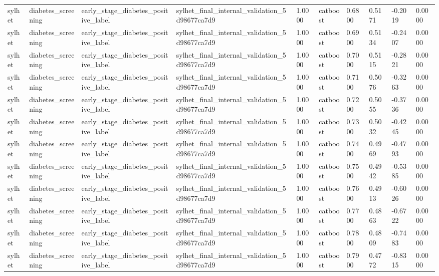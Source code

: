 \begin{tabular}{llllllllll}
sylhet & diabetes\_screening & early\_stage\_diabetes\_positive\_label & sylhet\_final\_internal\_validation\_5d98677ca7d9 & 1.0000 & catboost & 0.6800 & 0.5171 & -0.2019 & 0.0000 \\
sylhet & diabetes\_screening & early\_stage\_diabetes\_positive\_label & sylhet\_final\_internal\_validation\_5d98677ca7d9 & 1.0000 & catboost & 0.6900 & 0.5134 & -0.2407 & 0.0000 \\
sylhet & diabetes\_screening & early\_stage\_diabetes\_positive\_label & sylhet\_final\_internal\_validation\_5d98677ca7d9 & 1.0000 & catboost & 0.7000 & 0.5115 & -0.2821 & 0.0000 \\
sylhet & diabetes\_screening & early\_stage\_diabetes\_positive\_label & sylhet\_final\_internal\_validation\_5d98677ca7d9 & 1.0000 & catboost & 0.7100 & 0.5076 & -0.3263 & 0.0000 \\
sylhet & diabetes\_screening & early\_stage\_diabetes\_positive\_label & sylhet\_final\_internal\_validation\_5d98677ca7d9 & 1.0000 & catboost & 0.7200 & 0.5055 & -0.3736 & 0.0000 \\
sylhet & diabetes\_screening & early\_stage\_diabetes\_positive\_label & sylhet\_final\_internal\_validation\_5d98677ca7d9 & 1.0000 & catboost & 0.7300 & 0.5032 & -0.4245 & 0.0000 \\
sylhet & diabetes\_screening & early\_stage\_diabetes\_positive\_label & sylhet\_final\_internal\_validation\_5d98677ca7d9 & 1.0000 & catboost & 0.7400 & 0.4969 & -0.4793 & 0.0000 \\
sylhet & diabetes\_screening & early\_stage\_diabetes\_positive\_label & sylhet\_final\_internal\_validation\_5d98677ca7d9 & 1.0000 & catboost & 0.7500 & 0.4942 & -0.5385 & 0.0000 \\
sylhet & diabetes\_screening & early\_stage\_diabetes\_positive\_label & sylhet\_final\_internal\_validation\_5d98677ca7d9 & 1.0000 & catboost & 0.7600 & 0.4913 & -0.6026 & 0.0000 \\
sylhet & diabetes\_screening & early\_stage\_diabetes\_positive\_label & sylhet\_final\_internal\_validation\_5d98677ca7d9 & 1.0000 & catboost & 0.7700 & 0.4863 & -0.6722 & 0.0000 \\
sylhet & diabetes\_screening & early\_stage\_diabetes\_positive\_label & sylhet\_final\_internal\_validation\_5d98677ca7d9 & 1.0000 & catboost & 0.7800 & 0.4809 & -0.7483 & 0.0000 \\
sylhet & diabetes\_screening & early\_stage\_diabetes\_positive\_label & sylhet\_final\_internal\_validation\_5d98677ca7d9 & 1.0000 & catboost & 0.7900 & 0.4772 & -0.8315 & 0.0000 \\

\end{tabular}
